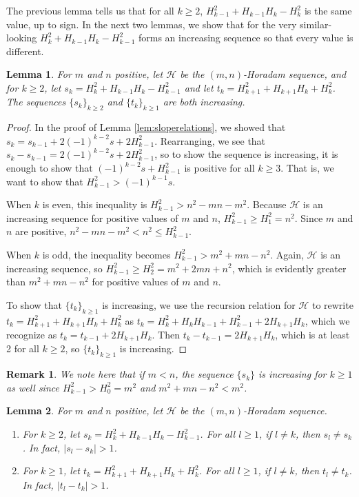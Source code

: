 \documentclass{amsart}
\newtheorem{lemma}{Lemma}
\newtheorem{rem}{Remark}
\begin{document}
The previous lemma tells us that for all $k \ge 2$, $H_{k-1}^2 +H_{k-1}H_{k} - H_{k}^2$ is the same value, up to sign. In the next two lemmas, we show that for the very similar-looking $H_{k}^2 +H_{k-1}H_{k} - H_{k-1}^2$ forms an increasing sequence so that every value is different.

\begin{lemma}\label{lem:increasing}
For $m$ and $n$ positive, let $\mathcal H$ be the $(m,n)$-Horadam sequence, and for $k \ge 2$, let $s_k = H_{k}^2 +H_{k-1}H_{k} - H_{k-1}^2$ and let $t_k = H_{k+1}^2 +H_{k+1}H_{k} + H_{k}^2$. The sequences $\{s_k \}_{k\ge 2}$ and $\{t_k \}_{k\ge 1}$ are both increasing. 
\end{lemma}

\begin{proof}

In the proof of Lemma \ref{lem:sloperelations}, we showed that $s_k = s_{k-1} + 2(-1)^{k-2} s + 2H_{k-1}^2$. Rearranging, we see that $s_k - s_{k-1} = 2(-1)^{k-2} s + 2H_{k-1}^2$, so to show the sequence is increasing, it is enough to show that $(-1)^{k-2} s + H_{k-1}^2$ is positive for all $k\ge 3$. That is, we want to show that $H_{k-1}^2 > (-1)^{k-1}s$. 

When $k$ is even, this inequality is $H_{k-1}^2 > n^2-mn-m^2$. Because $\mathcal H$ is an increasing sequence for positive values of $m$ and $n$, $H_{k-1}^2\ge H_1^2 = n^2$. Since $m$ and $n$ are positive, $n^2-mn-m^2<n^2 \le H_{k-1}^2$.

When $k$ is odd, the inequality becomes $H_{k-1}^2 > m^2+mn-n^2$. Again, $\mathcal H$ is an increasing sequence, so $H_{k-1}^2 \ge H_2^2 = m^2 + 2mn +n^2$, which is evidently greater than $m^2+mn-n^2$ for positive values of $m$ and $n$.

To show that $\{t_k \}_{k\ge 1}$ is increasing, we use the recursion relation for $\mathcal H$ to rewrite $t_k = H_{k+1}^2 +H_{k+1}H_{k} + H_{k}^2$ as $t_k = H^2_k + H_{k}H_{k-1} + H_{k-1}^2 + 2 H_{k+1}H_{k}$, which we recognize as $t_k = t_{k-1} + 2H_{k+1}H_k$. Then $t_k - t_{k-1} = 2H_{k+1}H_k$, which is at least 2 for all $k \ge 2$, so $\{t_{k}\}_{k\ge1}$ is increasing.
\end{proof}

\begin{rem}\label{rem:extendlemma}
We note here that if $m<n$, the sequence $\{s_k\}$ is increasing for $k\ge1$ as well since $H_{k-1}^2>H_0^2 = m^2$ and $m^2+mn-n^2 < m^2$. 
\end{rem}


\begin{lemma}\label{lem:slopesaredifferent}
For $m$ and $n$ positive, let $\mathcal H$ be the $(m,n)$-Horadam sequence. 
\begin{enumerate}
\item For $k \ge 2$, let $s_k = H_{k}^2 +H_{k-1}H_{k} - H_{k-1}^2$. For all $l \ge 1$, if $l\neq k$, then $s_l\neq s_k$. In fact, $|s_l - s_k|>1$.
\item For $k \ge 1$, let $t_k = H_{k+1}^2 +H_{k+1}H_{k} + H_{k}^2$. For all $l \ge 1$, if $l\neq k$, then $t_l\neq t_k$. In fact, $|t_l - t_k|>1$.
\end{enumerate}
\end{lemma}
\end{document}
